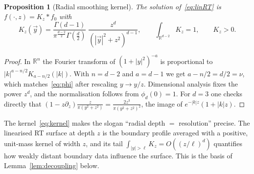 \documentclass[11pt]{article}
\newtheorem{proposition}{Proposition}[section]
\theoremstyle{definition}\newtheorem{definition}{Definition}[section]
\theoremstyle{remark}\newtheorem*{remark}{Remark}
\newcommand{\RR}{\mathbb{R}}
\begin{document}
\begin{proposition}[Radial smoothing kernel]
\label{prop:kernel}
The solution of~\eqref{eq:linRT} is $f(\cdot,z)=K_z*f_0$ with
\begin{equation}
K_z(\vec y)=\frac{\Gamma(d-1)}{\pi^{\frac{d-2}{2}}\Gamma(\frac d2)}\;\frac{z^d}{(|\vec y|^2+z^2)^{d-1}},
\qquad \int_{\RR^{d-2}}K_z=1,\qquad K_z>0 .
\label{eq:kernel}
\end{equation}
\end{proposition}
\begin{proof}
In $\RR^n$ the Fourier transform of $(1+|y|^2)^{-a}$ is proportional to $|k|^{a-n/2}K_{a-n/2}(|k|)$. With
$n=d-2$ and $a=d-1$ we get $a-n/2=d/2=\nu$, which matches~\eqref{eq:phi} after rescaling $y\to y/z$.
Dimensional analysis fixes the power $z^d$, and the normalisation follows from $\phi_d(0)=1$. For $d=3$ one
checks directly that $(1-z\partial_z)\frac{z}{\pi(y^2+z^2)}=\frac{2z^3}{\pi(y^2+z^2)^2}$, the image of
$e^{-|k|z}(1+|k|z)$.
\end{proof}
The kernel~\eqref{eq:kernel} makes the slogan ``radial depth $=$ resolution'' precise. The linearised RT surface
at depth $z$ is the boundary profile averaged with a positive, unit-mass kernel of width $z$, and its tail
$\int_{|y|>\ell}K_z=O((z/\ell)^{d})$ quantifies how weakly distant boundary data influence the surface. This
is the basis of Lemma~\ref{lem:decoupling} below.
\end{document}
